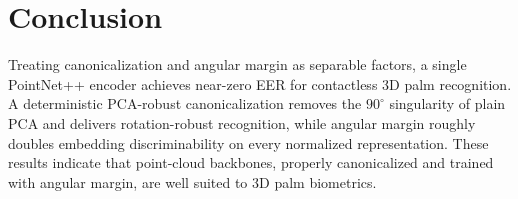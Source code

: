 \documentclass[conference]{IEEEtran}
\begin{document}
\section{Conclusion}
Treating canonicalization and angular margin as separable factors, a single
PointNet++ encoder achieves near-zero EER for contactless 3D palm recognition. A
deterministic PCA-robust canonicalization removes the $90^{\circ}$ singularity of
plain PCA and delivers rotation-robust recognition, while angular margin roughly
doubles embedding discriminability on every normalized representation. These
results indicate that point-cloud backbones, properly canonicalized and trained
with angular margin, are well suited to 3D palm biometrics.



\end{document}
